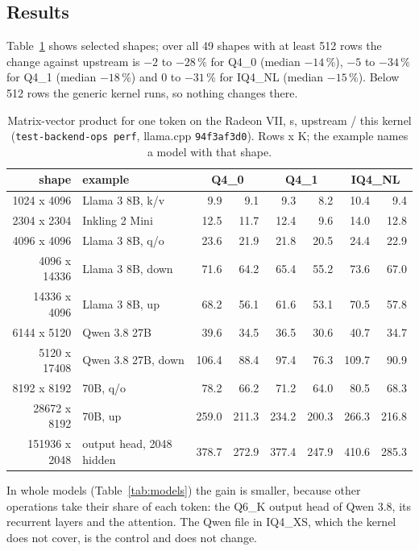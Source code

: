 \documentclass[11pt,a4paper]{article}
\newcommand{\code}[1]{\texttt{#1}}
\begin{document}
\subsection{Results}

Table~\ref{tab:mmv} shows selected shapes; over all 49 shapes with at least 512 rows the change against upstream is
$-2$ to $-28\,\%$ for Q4\_0 (median $-14\,\%$), $-5$ to $-34\,\%$ for Q4\_1 (median $-18\,\%$) and 0 to $-31\,\%$ for
IQ4\_NL (median $-15\,\%$). Below 512 rows the generic kernel runs, so nothing changes there.

\begin{table}[ht]
\centering
\caption{Matrix-vector product for one token on the Radeon VII, \textmu s, upstream / this kernel
(\code{test-backend-ops perf}, llama.cpp \code{94f3af3d0}). Rows x K; the example names a model with that shape.}
\label{tab:mmv}
\small
\begin{tabular}{rl rr rr rr}
\toprule
shape & example & \multicolumn{2}{c}{Q4\_0} & \multicolumn{2}{c}{Q4\_1} & \multicolumn{2}{c}{IQ4\_NL} \\
\midrule
1024 x 4096 & Llama 3 8B, k/v & 9.9 & 9.1 & 9.3 & 8.2 & 10.4 & 9.4 \\
2304 x 2304 & Inkling 2 Mini & 12.5 & 11.7 & 12.4 & 9.6 & 14.0 & 12.8 \\
4096 x 4096 & Llama 3 8B, q/o & 23.6 & 21.9 & 21.8 & 20.5 & 24.4 & 22.9 \\
4096 x 14336 & Llama 3 8B, down & 71.6 & 64.2 & 65.4 & 55.2 & 73.6 & 67.0 \\
14336 x 4096 & Llama 3 8B, up & 68.2 & 56.1 & 61.6 & 53.1 & 70.5 & 57.8 \\
6144 x 5120 & Qwen 3.8 27B & 39.6 & 34.5 & 36.5 & 30.6 & 40.7 & 34.7 \\
5120 x 17408 & Qwen 3.8 27B, down & 106.4 & 88.4 & 97.4 & 76.3 & 109.7 & 90.9 \\
8192 x 8192 & 70B, q/o & 78.2 & 66.2 & 71.2 & 64.0 & 80.5 & 68.3 \\
28672 x 8192 & 70B, up & 259.0 & 211.3 & 234.2 & 200.3 & 266.3 & 216.8 \\
151936 x 2048 & output head, 2048 hidden & 378.7 & 272.9 & 377.4 & 247.9 & 410.6 & 285.3 \\
\bottomrule
\end{tabular}
\end{table}

In whole models (Table~\ref{tab:models}) the gain is smaller, because other operations take their share of each
token: the Q6\_K output head of Qwen 3.8, its recurrent layers and the attention. The Qwen file in IQ4\_XS, which the
kernel does not cover, is the control and does not change.
\end{document}
